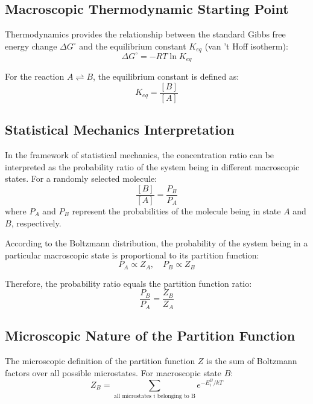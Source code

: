 \documentclass[12pt]{article}
\begin{document}
\subsection*{Macroscopic Thermodynamic Starting Point}
Thermodynamics provides the relationship between the standard Gibbs free energy change $\Delta G^\circ$ and the equilibrium constant $K_{eq}$ (van 't Hoff isotherm):
\begin{equation}
    \Delta G^\circ = -RT \ln K_{eq}
    \label{eq:vanthoff}
\end{equation}

For the reaction $A \rightleftharpoons B$, the equilibrium constant is defined as:
\begin{equation}
    K_{eq} = \frac{[B]}{[A]}
    \label{eq:keq_def}
\end{equation}

\subsection*{Statistical Mechanics Interpretation}
In the framework of statistical mechanics, the concentration ratio can be interpreted as the probability ratio of the system being in different macroscopic states. For a randomly selected molecule:
\begin{equation}
    \frac{[B]}{[A]} = \frac{P_B}{P_A}
    \label{eq:conc_to_prob}
\end{equation}
where $P_A$ and $P_B$ represent the probabilities of the molecule being in state $A$ and $B$, respectively.

According to the Boltzmann distribution, the probability of the system being in a particular macroscopic state is proportional to its partition function:
\begin{equation}
    P_A \propto Z_A, \quad P_B \propto Z_B
    \label{eq:prob_propto_z}
\end{equation}

Therefore, the probability ratio equals the partition function ratio:
\begin{equation}
    \frac{P_B}{P_A} = \frac{Z_B}{Z_A}
    \label{eq:prob_ratio}
\end{equation}

\subsection*{Microscopic Nature of the Partition Function}
The microscopic definition of the partition function $Z$ is the sum of Boltzmann factors over all possible microstates. For macroscopic state $B$:
\begin{equation}
    Z_B = \sum_{\text{all microstates } i \text{ belonging to B}} e^{-E_i^B / kT}
    \label{eq:z_def}
\end{equation}
\end{document}
